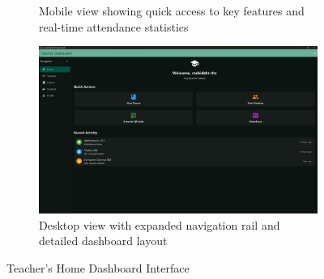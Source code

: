 \begin{figure}[H]
\begin{subfigure}[b]{0.35\textwidth}
        \caption{Mobile view showing quick access to key features and real-time attendance statistics}
    \end{subfigure}
    \hfill
    \begin{subfigure}[b]{0.35\textwidth}
        \includegraphics[width=\textwidth]{images/rachid/teacher-side-home-disktop.png}
        \caption{Desktop view with expanded navigation rail and detailed dashboard layout}
    \end{subfigure}
    \caption{Teacher's Home Dashboard Interface}
    \label{fig:home-interface}
\end{figure}

